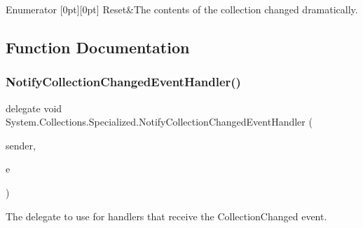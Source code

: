 \begin{DoxyEnumFields}{Enumerator}
[0pt][0pt]{}\mbox{\label{namespace_system_1_1_collections_1_1_specialized_a7e21ea761562ed22011c3120bbb31123a526d688f37a86d3c3f27d0c5016eb71d}} 
Reset&The contents of the collection changed dramatically. \\
\hline

\end{DoxyEnumFields}


\subsection{Function Documentation}
\mbox{\label{namespace_system_1_1_collections_1_1_specialized_af0fd13c7ac27802127a046f55bf0b789}} 
\subsubsection{\texorpdfstring{Notify\+Collection\+Changed\+Event\+Handler()}{NotifyCollectionChangedEventHandler()}}
{\footnotesize\ttfamily delegate void System.\+Collections.\+Specialized.\+Notify\+Collection\+Changed\+Event\+Handler (\begin{DoxyParamCaption}\item[{object}]{sender,  }\item[{\hyperlink{class_system_1_1_collections_1_1_specialized_1_1_notify_collection_changed_event_args}{Notify\+Collection\+Changed\+Event\+Args}}]{e }\end{DoxyParamCaption})}



The delegate to use for handlers that receive the Collection\+Changed event. 

